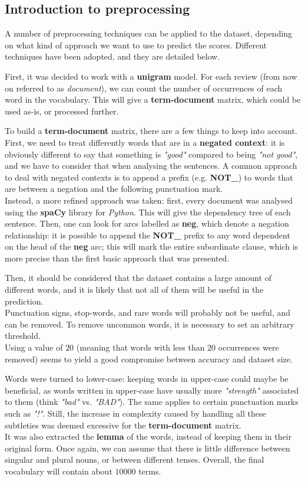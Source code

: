 \documentclass[
12pt,
a4paper,
oneside,
headinclude,
footinclude]{article}
\theoremstyle{definition} %
\begin{document}
\subsection{Introduction to preprocessing}
A number of preprocessing techniques can be applied to the dataset, depending on what kind of approach we want to use to predict the scores. Different techniques have been adopted, and they are detailed below.

First, it was decided to work with a \textbf{unigram} model. For each review (from now on referred to as \textit{document}), we can count the number of occurrences of each word in the vocabulary. This will give a \textbf{term-document} matrix, which could be used as-is, or processed further.

To build a \textbf{term-document} matrix, there are a few things to keep into account.\\
First, we need to treat differently words that are in a \textbf{negated context}: it is obviously different to say that something is \textit{"good"} compared to being \textit{"not good"}, and we have to consider that when analysing the sentences. A common approach to deal with negated contexts is to append a prefix (e.g. \textbf{NOT\_}) to words that are between a negation and the following punctuation mark.\\
Instead, a more refined approach was taken: first, every document was analysed using the \textbf{spaCy} library for \textit{Python}. This will give the dependency tree of each sentence. Then, one can look for arcs labelled as \textbf{neg}, which denote a negation relationship: it is possible to append the \textbf{NOT\_} prefix to any word dependent on the head of the \textbf{neg} arc; this will mark the entire subordinate clause, which is more precise than the first basic approach that was presented. 

Then, it should be considered that the dataset contains a large amount of different words, and it is likely that not all of them will be useful in the prediction.\\
Punctuation signs, stop-words, and rare words will probably not be useful, and can be removed. To remove uncommon words, it is necessary to set an arbitrary threshold.\\
 Using a value of $20$ (meaning that words with less than $20$ occurrences were removed) seems to yield a good compromise between accuracy and dataset size.

Words were turned to lower-case: keeping words in upper-case could maybe be beneficial, as words written in upper-case have usually more \textit{"strength"} associated to them (think \textit{"bad"} vs. \textit{"BAD"}). The same applies to certain punctuation marks such as \textit{"!"}. Still, the increase in complexity caused by handling all these subtleties was deemed excessive for the \textbf{term-document} matrix.\\
It was also extracted the \textbf{lemma} of the words, instead of keeping them in their original form. Once again, we can assume that there is little difference between singular and plural nouns, or between different tenses.
Overall, the final vocabulary will contain about $10000$ terms.
\end{document}
